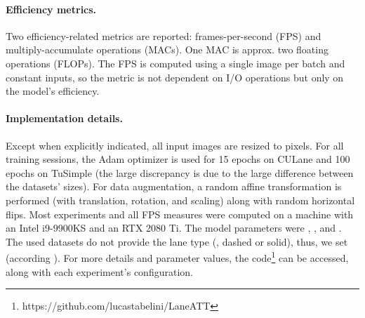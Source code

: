 \documentclass[final]{cvpr}
\begin{document}
\begin{table}[ht]
    \begin{center}
    \end{center}
    \caption{Overview of the datasets used in this work.}
    \label{tab:datasets}
\end{table} 

\paragraph{Efficiency metrics.}
Two efficiency-related metrics are reported: frames-per-second (FPS) and multiply-accumulate operations (MACs). One MAC is approx. two floating operations (FLOPs). The FPS is computed using a single image per batch and constant inputs, so the metric is not dependent on I/O operations but only on the model's efficiency.

\paragraph{Implementation details.}
Except when explicitly indicated, all input images are resized to  pixels. For all training sessions, the Adam optimizer is used for 15 epochs on CULane and 100 epochs on TuSimple (the large discrepancy is due to the large difference between the datasets' sizes). For data augmentation, a random affine transformation is performed (with translation, rotation, and scaling) along with random horizontal flips. Most experiments and all FPS measures were computed on a machine with an Intel i9-9900KS and an RTX 2080 Ti. The model parameters were , ,  and . The used datasets do not provide the lane type (\eg, dashed or solid), thus, we set  (according ). For more details and parameter values, the code\footnote{https://github.com/lucastabelini/LaneATT} can be accessed, along with each experiment's configuration.
\end{document}
